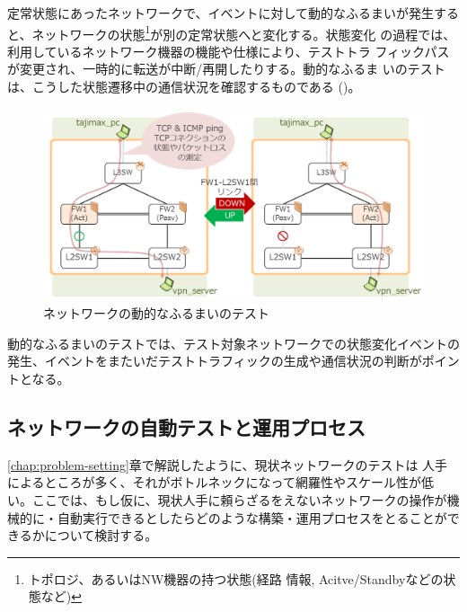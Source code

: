 定常状態にあったネットワークで、イベントに対して動的なふるまいが発生する
と、ネットワークの状態\footnote{トポロジ、あるいはNW機器の持つ状態(経路
情報, Acitve/Standbyなどの状態など)}が別の定常状態へと変化する。状態変化
の過程では、利用しているネットワーク機器の機能や仕様により、テストトラ
フィックパスが変更され、一時的に転送が中断/再開したりする。動的なふるま
いのテストは、こうした状態遷移中の通信状況を確認するものである
()。
\begin{figure}[h]
 \centering
 \includegraphics[scale=0.5]{img/test-dynamic.png}
 \caption{ネットワークの動的なふるまいのテスト}
 \label{fig:test-dynamic}
\end{figure}

動的なふるまいのテストでは、テスト対象ネットワークでの状態変化イベントの
発生、イベントをまたいだテストトラフィックの生成や通信状況の判断がポイン
トとなる。

  \subsection{ネットワークの自動テストと運用プロセス}
  \label{sec:network-test-and-process}


\ref{chap:problem-setting}章で解説したように、現状ネットワークのテストは
人手によるところが多く、それがボトルネックになって網羅性やスケール性が低
い。ここでは、もし仮に、現状人手に頼らざるをえないネットワークの操作が機
械的に・自動実行できるとしたらどのような構築・運用プロセスをとることがで
きるかについて検討する。

